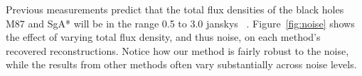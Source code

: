 Previous measurements predict that the total flux densities of the black holes M87 and SgA* will be in the range 0.5 to 3.0 janskys
~\cite{doeleman2012jet, doeleman2008event}.
Figure~\ref{fig:noise} shows the effect of varying total flux density, and thus noise, on each method's recovered reconstructions. Notice how our method is fairly robust to the noise, while the results from other methods often vary substantially across noise levels. 











 
